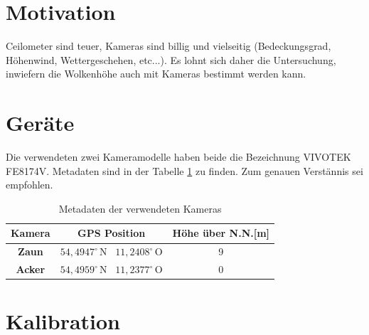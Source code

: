 \documentclass[a4paper,11pt,twoside,german]{article}
\newcommand{\absatz}{\smallbreak} %
\begin{document}
\listoffigures %

\newpage


\section{Motivation}

Ceilometer sind teuer, Kameras sind billig und vielseitig (Bedeckungsgrad,
Höhenwind, Wettergeschehen, etc...).  Es lohnt sich daher die Untersuchung,
inwiefern die Wolkenhöhe auch mit Kameras bestimmt werden kann.
\absatz
\blindtext[1]


\section{Geräte}

Die verwendeten zwei Kameramodelle haben beide die Bezeichnung VIVOTEK FE8174V.
Metadaten sind in der Tabelle \ref{TabelleKameraMeta} zu finden.
Zum genauen Verstännis sei \cite{2016ingo} empfohlen.
\absatz

\begin{table}[!h]
\begin{center}
\caption{Metadaten der verwendeten Kameras}
\label{TabelleKameraMeta}
\absatz
\begin{tabular}{|c|c|c|}
\hline
\textbf{Kamera} & \textbf{GPS Position} & \textbf{Höhe über N.N.[m]} \\\hline
\textbf{Zaun}   & $54,4947^\circ\,\mathrm{N}$ \, $11,2408^\circ\,\mathrm{O}$ &
9                \\\hline
\textbf{Acker}   & $54,4959^\circ\,\mathrm{N}$ \, $11,2377^\circ\,\mathrm{O}$ &
0                \\\hline
\end{tabular}
\vspace{-0.5cm}
\end{center}
\end{table}

\blindtext


\section{Kalibration}
\end{document}
